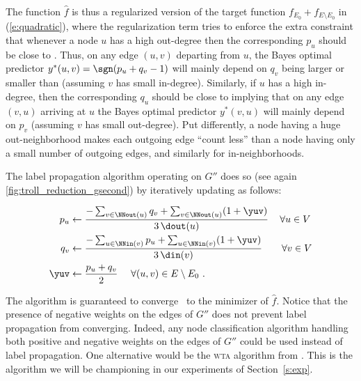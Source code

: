 The function ${\widehat f}$ is thus a regularized version of the target function $f_{E_0} +
f_{E\setminus E_0}$ in (\ref{e:quadratic}), where the regularization term tries to enforce the extra
constraint that whenever a node $u$ has a high out-degree then the corresponding $p_u$ should be
close to \shalf. Thus, on any edge $(u,v)$ departing from $u$, the Bayes optimal predictor $y^*(u,v)
= \sgn(p_u+q_v-1)$ will mainly depend on $q_v$ being larger or smaller than \shalf{} (assuming $v$
has small in-degree). Similarly, if $u$ has a high in-degree, then the corresponding $q_u$ should be
close to \shalf{} implying that on any edge $(v,u)$ arriving at $u$ the Bayes optimal predictor
$y^*(v,u)$ will mainly depend on $p_v$ (assuming $v$ has small out-degree). Put differently, a node
having a huge out-neighborhood makes each outgoing edge \enquote{count less} than a node having only
a small number of outgoing edges, and similarly for in-neighborhoods.

The label propagation algorithm operating on $G''$ does so (see again
\autoref{fig:troll_reduction_gsecond}) by iteratively updating as follows:

\begin{align*}
  p_{u}  & \leftarrow \frac{-\sum_{v \in \NNout(u)} q_{v} + \sum_{v \in \NNout(u)} (1+\yuv)}{3\,\dout(u)}\,\quad\forall u\in V\\
  q_{v}  & \leftarrow \frac{-\sum_{u \in  \NNin(v)} p_{u} + \sum_{u \in \NNin(v) } (1+\yuv)}{3\,\din(v)}\qquad\forall v \in V\\
  \yuv & \leftarrow \frac{p_u + q_v}{2}~ \quad \forall (u,v) \in E\setminus E_0~.
\end{align*}

The algorithm is guaranteed to converge~\autocite{LabelPropa03} to the minimizer of ${\widehat f}$.
Notice that the presence of negative weights on the edges of $G''$ does not prevent label
propagation from converging. Indeed, any node classification algorithm handling both positive and
negative weights on the edges of $G''$ could be used instead of label propagation. One alternative
would be the \textsc{wta} algorithm from \autocite{WTA13}.  This is the algorithm we will be
championing in our experiments of Section~\ref{s:exp}.


